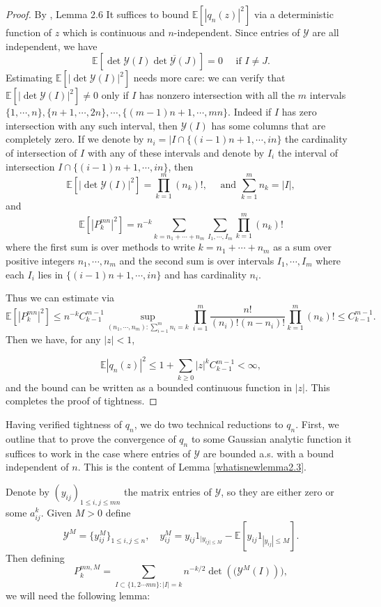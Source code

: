 \documentclass[12pt, reqno]{amsart}
\theoremstyle{definition}
\theoremstyle{remark}
\numberwithin{equation}{section}
\begin{document}
\begin{proof} By \cite{shirai2012limit}, Lemma 2.6
    It suffices to bound $\mathbb{E}[|q_n(z)|^2]$ via a deterministic function of $z$ which is continuous and $n$-independent. Since entries of $\mathcal{Y}$ are all independent, we have 
   $$\mathbb{E}\left[\det\mathcal{Y}(I)\overline{\det\mathcal{Y}(J)}\right]=0\quad\text{ if } I\neq J.
    $$ Estimating $\mathbb{E}[|\det\mathcal{Y}(I)|^2]$ needs more care: we can verify that $\mathbb{E}[|\det\mathcal{Y}(I)|^2]\neq 0$ only if $I$ has nonzero intersection with all the $m$ intervals $\{1,\cdots,n\},\{n+1,\cdots,2n\},\cdots,\{(m-1)n+1,\cdots,mn\}$. Indeed if $I$ has zero intersection with any such interval, then $\mathcal{Y}(I)$ has some columns that are completely zero. If we denote by $n_i=|I\cap \{(i-1)n+1,\cdots,in\}$ the cardinality of intersection of $I$ with any of these intervals and denote by $I_i$ the interval of intersection $I\cap \{(i-1)n+1,\cdots,in\}$, then 
    $$
\mathbb{E}[|\det\mathcal{Y}(I)|^2]=\prod_{k=1}^m (n_k)!,\quad\text{ and } \sum_{k=1}^m n_k=|I|,
    $$ and 
    $$
\mathbb{E}[|P_k^{mn}|^2]=n^{-k}\sum_{k=n_1+\cdots+n_m}\sum_{I_1,\cdots,I_m} \prod_{k=1}^m(n_k)!
    $$
where the first sum is over methods to write $k=n_1+\cdots+n_m$ as a sum over positive integers $n_1,\cdots,n_m$ and the second sum is over intervals $I_1,\cdots,I_m$ where each $I_i$ lies in $\{(i-1)n+1,\cdots,in\}$ and has cardinality $n_i$. 

Thus we can estimate via 
\begin{equation}\label{equation233332}
\mathbb{E}[|P_k^{mn}|^2]\leq n^{-k}C_{k-1}^{m-1}\sup_{(n_1,\cdots,n_m):\sum_{i=1}^m n_i=k}\prod_{i=1}^m\frac{n!}{(n_i)!(n-n_i)!}\prod_{k=1}^m(n_k)!
  \leq C_{k-1}^{m-1}.\end{equation}
Then we have, for any $|z|<1$,

$$
\mathbb{E}|q_n(z)|^2\leq1+\sum_{k\geq 0}|z|^kC_{k-1}^{m-1}<\infty,
$$and the bound can be written as a bounded continuous function in $|z|$. This completes the proof of tightness.
\end{proof}

Having verified tightness of $q_n$, we do two technical reductions to $q_n$. First, we outline that to prove the convergence of $q_n$ to some Gaussian analytic function it suffices to work in the case where entries of $\mathcal{Y}$ are bounded a.s. with a bound independent of $n$. This is the content of Lemma \ref{whatisnewlemma2.3}.

 Denote by $(y_{ij})_{1\leq i,j\leq mn}$ the matrix entries of $\mathcal{Y}$, so they are either zero or some $a_{ij}^k$.
 Given $M>0$ define $$\mathcal{Y}^M=\{y_{ij}^M\}_{1\leq i,j\leq n},\quad y_{ij}^M=y_{ij}1_{|y_{ij|\leq M}}-\mathbb{E}[y_{ij}1_{|y_{ij}|\leq M}].$$
Then defining $$P_k^{mn,M}=\sum_{I\subset\{1,2\cdots mn\}:|I|=k}n^{-k/2}\det\left((\mathcal{Y}^M(I)\right)),$$ we will need the following lemma:
\end{document}
